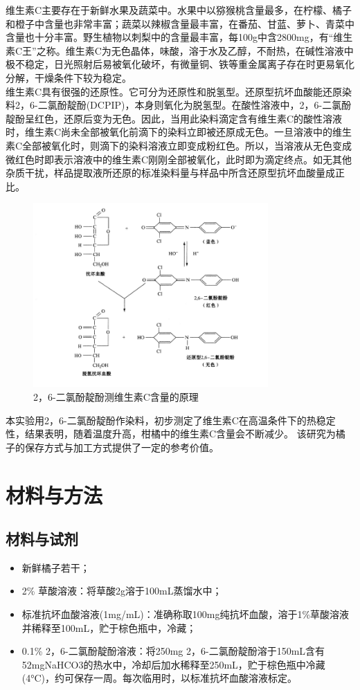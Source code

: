 \documentclass[12pt,hyperref,a4paper,UTF8]{ctexart}
\begin{document}
	维生素C主要存在于新鲜水果及蔬菜中。水果中以猕猴桃含量最多，在柠檬、橘子和橙子中含量也非常丰富；蔬菜以辣椒含量最丰富，在番茄、甘蓝、萝卜、青菜中含量也十分丰富。野生植物以刺梨中的含量最丰富，每100g中含2800mg，有“维生素C王”之称。维生素C为无色晶体，味酸，溶于水及乙醇，不耐热，在碱性溶液中极不稳定，日光照射后易被氧化破坏，有微量铜、铁等重金属离子存在时更易氧化分解，干燥条件下较为稳定。\cite{2}\\

	维生素C具有很强的还原性。它可分为还原性和脱氢型。还原型抗坏血酸能还原染料2，6-二氯酚靛酚(DCPIP)，本身则氧化为脱氢型。在酸性溶液中，2，6-二氯酚靛酚呈红色，还原后变为无色。因此，当用此染料滴定含有维生素C的酸性溶液时，维生素C尚未全部被氧化前滴下的染料立即被还原成无色。一旦溶液中的维生素C全部被氧化时，则滴下的染料溶液立即变成粉红色。所以，当溶液从无色变成微红色时即表示溶液中的维生素C刚刚全部被氧化，此时即为滴定终点。如无其他杂质干扰，样品提取液所还原的标准染料量与样品中所含还原型抗坏血酸量成正比。
	\begin{figure}[H]
		\centering
		\includegraphics[width=0.8\textwidth]{figures/1.png}
		\caption{2，6-二氯酚靛酚测维生素C含量的原理}
		\label{fig:your_image}
	\end{figure}
	本实验用2，6-二氯酚靛酚作染料，初步测定了维生素C在高温条件下的热稳定性，结果表明，随着温度升高，柑橘中的维生素C含量会不断减少。
该研究为橘子的保存方式与加工方式提供了一定的参考价值。

\section{材料与方法}
\subsection{材料与试剂}
\begin{itemize}
	\item 新鲜橘子若干；
	\item 2\% 草酸溶液：将草酸2g溶于100mL蒸馏水中；
	\item 标准抗坏血酸溶液(1mg/mL)：准确称取100mg纯抗坏血酸，溶于1\%草酸溶液并稀释至100mL，贮于棕色瓶中，冷藏；
	\item 0.1\% 2，6-二氯酚靛酚溶液：将250mg 2，6-二氯酚靛酚溶于150mL含有52mgNaHCO3的热水中，冷却后加水稀释至250mL，贮于棕色瓶中冷藏(4°C)，约可保存一周。每次临用时，以标准抗坏血酸溶液标定。
\end{itemize}
\end{document}
